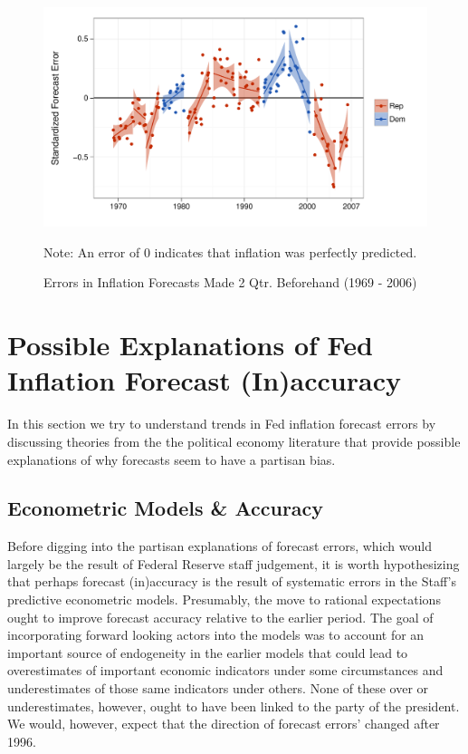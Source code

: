 \documentclass[a4paper]{article}
\begin{document}
\begin{figure}[t]
    \caption{Errors in Inflation Forecasts Made 2 Qtr. Beforehand (1969 - 2006)}
    \label{errors_over_time}
    \begin{center}
    
\begin{knitrout}
\color{fgcolor}\includegraphics[width=0.8\linewidth]{figure/PartisanError} 
\end{knitrout}

    
    \end{center}
    \begin{singlespace}
        {\scriptsize{Note: An error of 0 indicates that inflation was perfectly predicted.}}
    \end{singlespace}
\end{figure}


\section{Possible Explanations of Fed Inflation Forecast (In)accuracy}

In this section we try to understand trends in Fed inflation forecast errors by discussing theories from the the political economy literature that provide possible explanations of why forecasts seem to have a partisan bias. 

\subsection{Econometric Models \& Accuracy}

Before digging into the partisan explanations of forecast errors, which would largely be the result of Federal Reserve staff judgement, it is worth hypothesizing that perhaps forecast (in)accuracy is the result of systematic errors in the Staff's predictive econometric models. Presumably, the move to rational expectations ought to improve forecast accuracy relative to the earlier period. The goal of incorporating forward looking actors into the models was to account for an important source of endogeneity in the earlier models that could lead to overestimates of important economic indicators under some circumstances and underestimates of those same indicators under others. None of these over or underestimates, however, ought to have been linked to the party of the president. We would, however, expect that the direction of forecast errors' changed after 1996.
\end{document}

